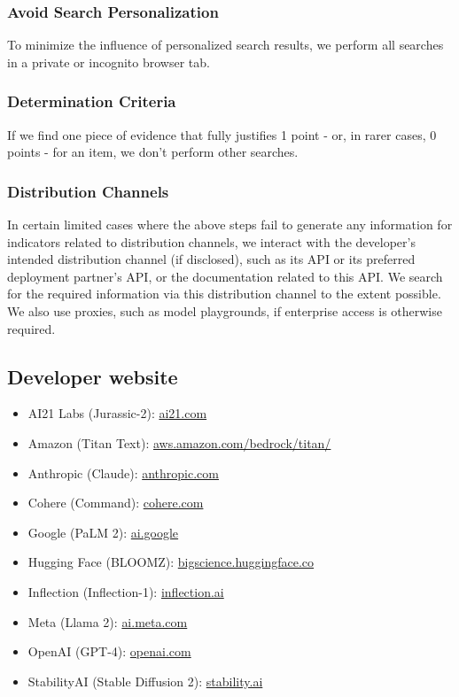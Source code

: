 \subsubsection{Avoid Search Personalization}
To minimize the influence of personalized search results, we perform all searches in a private or incognito browser tab.

\subsubsection{Determination Criteria}
If we find one piece of evidence that fully justifies 1 point - or, in rarer cases, 0 points - for an item, we don't perform other searches.

\subsubsection{Distribution Channels}
In certain limited cases where the above steps fail to generate any information for indicators related to distribution channels, we interact with the developer’s intended distribution channel (if disclosed), such as its API or its preferred deployment partner’s API, or the documentation related to this API. We search for the required information via this distribution channel to the extent possible. We also use proxies, such as model playgrounds, if enterprise access is otherwise required.

\subsection{Developer website}

\begin{itemize}
\item AI21 Labs (Jurassic-2): \url{ai21.com}
\item Amazon (Titan Text): \url{aws.amazon.com/bedrock/titan/}
\item Anthropic (Claude): \url{anthropic.com}
\item Cohere (Command): \url{cohere.com}
\item Google (PaLM 2): \url{ai.google}
\item Hugging Face (BLOOMZ): \url{bigscience.huggingface.co}
\item Inflection (Inflection-1): \url{inflection.ai}
\item Meta (Llama 2): \url{ai.meta.com}
\item OpenAI (GPT-4): \url{openai.com}
\item StabilityAI (Stable Diffusion 2): \url{stability.ai}

\end{itemize}

